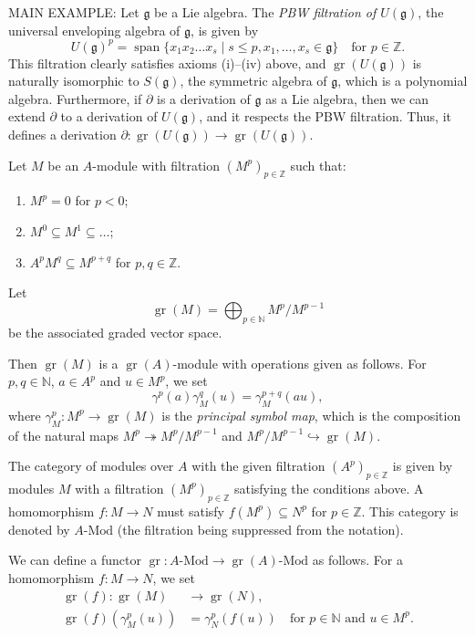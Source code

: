 \documentclass[a4paper, 12pt, reqno]{amsart}
\DeclareMathOperator{\gr}{gr}
\DeclareMathOperator{\vspan}{span}
\begin{document}
MAIN EXAMPLE: Let $\mathfrak{g}$ be a Lie algebra.
The \emph{PBW filtration of $U(\mathfrak{g})$}, the universal enveloping algebra of $\mathfrak{g}$, is given by
\begin{equation*}
  U(\mathfrak{g})^p = \vspan\{x_1x_2\dots x_s \mid s \le p, x_1, \dots, x_s \in \mathfrak{g}\} \quad \text{for $p \in \mathbb{Z}$}.
\end{equation*}
This filtration clearly satisfies axioms (i)--(iv) above, and $\gr(U(\mathfrak{g}))$ is naturally isomorphic to $S(\mathfrak{g})$, the symmetric algebra of $\mathfrak{g}$, which is a polynomial algebra.
Furthermore, if $\partial$ is a derivation of $\mathfrak{g}$ as a Lie algebra, then we can extend $\partial$ to a derivation of $U(\mathfrak{g})$, and it respects the PBW filtration.
Thus, it defines a derivation $\partial: \gr(U(\mathfrak{g})) \to \gr(U(\mathfrak{g}))$.

Let $M$ be an $A$-module with filtration $(M^p)_{p \in \mathbb{Z}}$ such that:
\begin{enumerate}
\item $M^p = 0$ for $p < 0$;
\item $M^0 \subseteq M^1 \subseteq \dots$;
\item $A^pM^q \subseteq M^{p + q}$ for $p, q \in \mathbb{Z}$.
\end{enumerate}
Let
\begin{equation*}
  \gr(M) = \bigoplus_{p \in \mathbb{N}}M^p/M^{p - 1}
\end{equation*}
be the associated graded vector space.

Then $\gr(M)$ is a $\gr(A)$-module with operations given as follows.
For $p, q \in \mathbb{N}$, $a \in A^p$ and $u \in M^p$, we set
\begin{equation*}
  \gamma^p(a)\gamma^q_M(u) = \gamma^{p + q}_M(au),
\end{equation*}
where $\gamma^p_M: M^p \to \gr(M)$ is the \emph{principal symbol map}, which is the composition of the natural maps $M^p \twoheadrightarrow M^p/M^{p - 1}$ and $M^p/M^{p - 1} \hookrightarrow \gr(M)$.

The category of modules over $A$ with the given filtration $(A^p)_{p \in \mathbb{Z}}$ is given by modules $M$ with a filtration $(M^p)_{p \in \mathbb{Z}}$ satisfying the conditions above.
A homomorphism $f: M \to N$ must satisfy $f(M^p) \subseteq N^p$ for $p \in \mathbb{Z}$.
This category is denoted by $A\text{-Mod}$ (the filtration being suppressed from the notation).

We can define a functor $\gr: A\text{-Mod} \to \gr(A)\text{-Mod}$ as follows.
For a homomorphism $f: M \to N$, we set
\begin{align*}
  \gr(f): \gr(M) &\to \gr(N), \\
  \gr(f)(\gamma_M^p(u)) &= \gamma_N^p(f(u)) \quad \text{for $p \in \mathbb{N}$ and $u \in M^p$}.
\end{align*}
\end{document}
